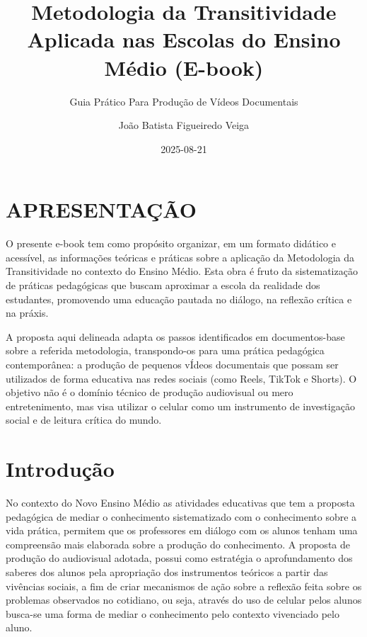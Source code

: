 \documentclass[
  letterpaper,
  DIV=11,
  numbers=noendperiod]{scrreport}
\title{Metodologia da Transitividade Aplicada nas Escolas do Ensino
Médio (E-book)}
\subtitle{Guia Prático Para Produção de Vídeos Documentais}
\author{João Batista Figueiredo Veiga}
\date{2025-08-21}
\renewcommand*\contentsname{Table of contents}
\newcommand\contentsname{Table of contents}
\begin{document}
\maketitle

\renewcommand*\contentsname{Table of contents}
{
\setcounter{tocdepth}{2}
\tableofcontents
}


\chapter*{APRESENTAÇÃO}\label{apresentauxe7uxe3o}


O presente e-book tem como propósito organizar, em um formato didático e
acessível, as informações teóricas e práticas sobre a aplicação da
Metodologia da Transitividade no contexto do Ensino Médio. Esta obra é
fruto da sistematização de práticas pedagógicas que buscam aproximar a
escola da realidade dos estudantes, promovendo uma educação pautada no
diálogo, na reflexão crítica e na práxis.

A proposta aqui delineada adapta os passos identificados em
documentos-base sobre a referida metodologia, transpondo-os para uma
prática pedagógica contemporânea: a produção de pequenos vÍdeos
documentais que possam ser utilizados de forma educativa nas redes
sociais (como Reels, TikTok e Shorts). O objetivo não é o domínio
técnico de produção audiovisual ou mero entretenimento, mas visa
utilizar o celular como um instrumento de investigação social e de
leitura crítica do mundo.


\chapter{Introdução}\label{introduuxe7uxe3o}

No contexto do Novo Ensino Médio as atividades educativas que tem a
proposta pedagógica de mediar o conhecimento sistematizado com o
conhecimento sobre a vida prática, permitem que os professores em
diálogo com os alunos tenham uma compreensão mais elaborada sobre a
produção do conhecimento. A proposta de produção do audiovisual adotada,
possui como estratégia o aprofundamento dos saberes dos alunos pela
apropriação dos instrumentos teóricos a partir das vivências sociais, a
fim de criar mecanismos de ação sobre a reflexão feita sobre os
problemas observados no cotidiano, ou seja, através do uso de celular
pelos alunos busca-se uma forma de mediar o conhecimento pelo contexto
vivenciado pelo aluno.
\end{document}
